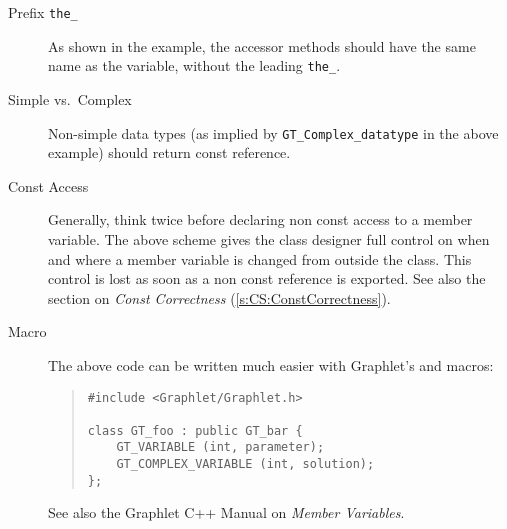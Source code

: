 \begin{description} 
  \item[Prefix \texttt{the\_}] As shown in the example, the
  accessor methods should have the same name as the variable,
  without the leading \texttt{the\_}.

  \item[Simple vs.\ Complex] Non-simple data types (as implied by 
  \texttt{GT\_Complex\_datatype} in the above example) should return 
  const reference.
  
  \item[Const Access] Generally, think twice before declaring non
  const access to a member variable.  The above scheme gives the
  class designer full control on when and where a member variable
  is changed from outside the class.  This control is lost as
  soon as a non const reference is exported.  See also the
  section on \emph{Const Correctness}
  (\ref{s:CS:ConstCorrectness}).
  
  \item[ Macro] The above code can be written much
  easier with Graphlet's  and 
  macros:
  
\begin{quote}
\begin{verbatim}
#include <Graphlet/Graphlet.h>
        
class GT_foo : public GT_bar {
    GT_VARIABLE (int, parameter);
    GT_COMPLEX_VARIABLE (int, solution);
};
\end{verbatim}
\end{quote}

See also the Graphlet C++ Manual on \emph{Member Variables}.

\end{description}

